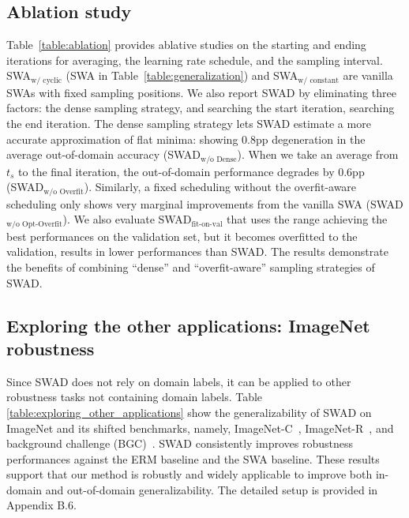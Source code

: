 \subsection{Ablation study}
\label{label:s__ablation}
\vspace{-.5em}


Table~\ref{table:ablation} provides ablative studies on the starting and ending iterations for averaging, the learning rate schedule, and the sampling interval. SWA$_\text{w/ cyclic}$ (SWA in Table~\ref{table:generalization}) and SWA$_\text{w/ constant}$ are vanilla SWAs with fixed sampling positions. 
We also report SWAD by eliminating three factors: the dense sampling strategy, and searching the start iteration, searching the end iteration.
The dense sampling strategy lets SWAD estimate a more accurate approximation of flat minima: showing 0.8pp degeneration in the average out-of-domain accuracy (SWAD$_\text{w/o Dense}$).
When we take an average from $t_s$ to the final iteration, the out-of-domain performance degrades by 0.6pp (SWAD$_\text{w/o Overfit}$). Similarly, a fixed scheduling without the overfit-aware scheduling only shows very marginal improvements from the vanilla SWA (SWAD$_\text{w/o Opt-Overfit}$).
We also evaluate SWAD$_\text{fit-on-val}$ that uses the range achieving the best performances on the validation set, but it becomes overfitted to the validation, results in lower performances than SWAD.
The results demonstrate the benefits of combining ``dense'' and ``overfit-aware'' sampling strategies of SWAD.


\subsection{Exploring the other applications: ImageNet robustness}
\vspace{-.5em}


Since SWAD does not rely on domain labels, it can be applied to other robustness tasks not containing domain labels.
Table \ref{table:exploring_other_applications} show the generalizability of SWAD on ImageNet \cite{russakovsky2015imagenet} and its shifted benchmarks, namely, ImageNet-C~\cite{hendrycks2018benchmarking_robustness_imagenet_c}, ImageNet-R~\cite{hendrycks2020many_face_of_robustness}, and background challenge (BGC)~\cite{xiao2020background_challenge_bgc}.
SWAD consistently improves robustness performances against the ERM baseline and the SWA baseline.
These results support that our method is robustly and widely applicable to improve both in-domain and out-of-domain generalizability. The detailed setup is provided in Appendix B.6.

